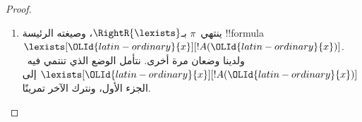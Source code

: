\documentclass[../../../include/open-logic-section]{subfiles}
\begin{document}
\begin{proof}
\begin{enumerate}
    ويعطينا فرض الاستقراء~$\Lang L(!C_\OLMathNumeral{1}) \subseteq \Lang L(\OLId{greek-variable}{Gamma}_\OLMathNumeral{1},
    \OLId{greek-variable}{Delta}_\OLMathNumeral{1}, !A(\OLId{latin-ordinary}{c})) \cap \Lang L(\OLId{greek-variable}{Gamma}_\OLMathNumeral{2}, \OLId{greek-variable}{Delta}_\OLMathNumeral{2})$. فلذلك لا يبقى
    إلا القلق بشأن~$\OLId{latin-ordinary}{c}$: هل يجوز أن تظهر في~$!C_\OLMathNumeral{1}$؟ لا يمكن. فلو ظهرت
    فيها لكان كل من~$\OLId{latin-ordinary}{c} \in \Lang L(\OLId{greek-variable}{Gamma}_\OLMathNumeral{1}, \OLId{greek-variable}{Delta}_\OLMathNumeral{1}, !A(\OLId{latin-ordinary}{c}))$، وهو
    صحيح، و$\OLId{latin-ordinary}{c} \in \Lang L(\OLId{greek-variable}{Gamma}_\OLMathNumeral{2}, \OLId{greek-variable}{Delta}_\OLMathNumeral{2})$. غير أن~$\OLId{latin-ordinary}{c}$ كانت عندئذ
    ستظهر في نتيجة استدلال~$\RightR{\lforall}$ في~$\pi$، خلافًا لشرط
    المتغير المميز.

    والحالة الأخرى مماثلة.

    \item ينتهي~$\pi$ بـ$\RightR{\lexists}$، وصيغته الرئيسة
    !!{formula}~$\lexists[\OLId{latin-ordinary}{x}][!A(\OLId{latin-ordinary}{x})]$. ولدينا وضعان مرة أخرى. نتأمل
    الوضع الذي تنتمي فيه~$\lexists[\OLId{latin-ordinary}{x}][!A(\OLId{latin-ordinary}{x})]$ إلى الجزء الأول، ونترك
    الآخر تمرينًا.


\end{enumerate}
\end{proof}
\end{document}
